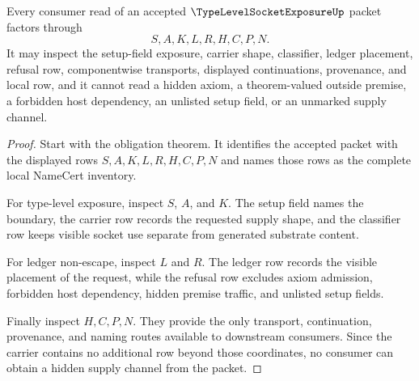 \begin{theorem}
\label{thm:type-level-socket-exposure-ledger-nonescape}
Every consumer read of an accepted $\TypeLevelSocketExposureUp$ packet factors through
$$
S,A,K,L,R,H,C,P,N.
$$
It may inspect the setup-field exposure, carrier shape, classifier, ledger placement, refusal row, componentwise transports, displayed continuations, provenance, and local \NameCert{} row, and it cannot read a hidden axiom, a theorem-valued outside premise, a forbidden host dependency, an unlisted setup field, or an unmarked supply channel.
\end{theorem}
\begin{proof}
Start with the obligation theorem. It identifies the accepted packet with the displayed rows $S,A,K,L,R,H,C,P,N$ and names those rows as the complete local NameCert inventory.

For type-level exposure, inspect $S$, $A$, and $K$. The setup field names the boundary, the carrier row records the requested supply shape, and the classifier row keeps visible socket use separate from generated substrate content.

For ledger non-escape, inspect $L$ and $R$. The ledger row records the visible placement of the request, while the refusal row excludes axiom admission, forbidden host dependency, hidden premise traffic, and unlisted setup fields.

Finally inspect $H,C,P,N$. They provide the only transport, continuation, provenance, and naming routes available to downstream consumers. Since the carrier contains no additional row beyond those coordinates, no consumer can obtain a hidden supply channel from the packet.
\end{proof}


